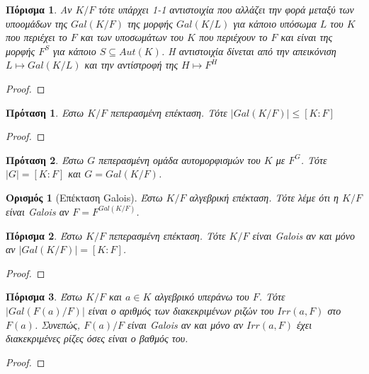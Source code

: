 \documentclass[oneside,a4paper]{article}
\newtheorem*{defn}{Ορισμός}
\newtheorem{prop}{Πρόταση}
\newtheorem{cor}{Πόρισμα}
\newcommand {\tl}{\textlatin}
\begin{document}
\begin{cor} Αν $K/F$ τότε υπάρχει 1-1 αντιστοιχία που αλλάζει την φορά μεταξύ των υποομάδων της $Gal(K/F)$ της μορφής $Gal(K/L)$ για κάποιο υπόσωμα $L$ του $K$ που περιέχει το $F$ και των υποσωμάτων του $K$ που περιέχουν το $F$ και είναι της μορφής $F^S$ για κάποιο $S \subseteq Aut(K)$. Η αντιστοιχία δίνεται από την απεικόνιση $L \mapsto Gal(K/L)$ και την αντίστροφή της $H \mapsto F^H$
\end{cor}
\begin{proof}
\end{proof}

\begin{prop}
	Εστω $K/F$ πεπερασμένη επέκταση. Τότε $|Gal(K/F)| \leq [K:F]$
\end{prop}

\begin{proof}
\end{proof}

\begin{prop}
	\label{duo dekatessera}
	Έστω $G$ πεπερασμένη ομάδα αυτομορφισμών του $K$ με $F^G$. Τότε $|G| = [K:F]$ και $G = Gal(K/F)$.
\end{prop}

\begin{defn}[Επέκταση \tl{Galois}]
	Έστω $K/F$ αλγεβρική επέκταση. Τότε λέμε ότι η $K/F$ είναι \tl{Galois} αν $F = F^{Gal(K/F)}$.
\end{defn}

\begin{cor}
	Έστω $K/F$ πεπερασμένη επέκταση. Τότε $K/F$ είναι \tl{Galois} αν και μόνο αν $|Gal(K/F)| = [K:F]$.
\end{cor}
\begin{proof}
\end{proof}

\begin{cor} Έστω $K/F$ και $a\in K$ αλγεβρικό υπεράνω του $F$. Τότε $|Gal(F(a)/F)|$ είναι ο αριθμός των διακεκριμένων ριζών του $Irr(a,F)$ στο $F(a)$. Συνεπώς, $F(a)/F$ είναι \tl{Galois} αν και μόνο αν $Irr(a,F)$ έχει διακεκριμένες ρίζες όσες είναι ο βαθμός του.
\end{cor}
\begin{proof}
\end{proof}
\end{document}

